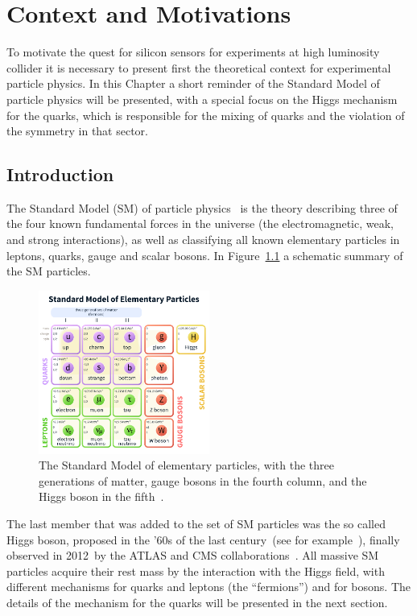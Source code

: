 \chapter{Context and Motivations}
\label{chap:context}
To motivate the quest for silicon sensors for experiments at high luminosity collider it is necessary 
to present first the theoretical context for experimental particle physics. In this Chapter a short 
reminder of the Standard Model of particle physics will be presented, with a special focus on 
the Higgs mechanism for the quarks, which is responsible for the mixing of quarks and the 
violation of the \CP symmetry in that sector.

\section{Introduction}
\label{sec:intro}

The Standard Model (SM) of particle physics~\cite{GLASHOW1961579,PhysRevLett.19.1264,SalamSM,PhysRevLett.30.1343,PhysRevLett.30.1346} is the theory describing three of the four known fundamental forces in the universe (the electromagnetic, weak, and strong interactions), as well as classifying all known elementary particles in leptons, quarks, gauge and scalar bosons. In Figure~\ref{fig:SM} a schematic summary of the SM 
particles.


\begin{figure}[htbp]
   \centering
   \includegraphics[width=0.5\textwidth]{SM.png} %
   \caption{The Standard Model of elementary particles, with the three generations of matter, gauge bosons in the fourth column, and the Higgs boson in the fifth~\cite{wiki:xxx}.}
   \label{fig:SM}
\end{figure}

The last member that was added to the set of SM particles was the so called Higgs boson, proposed in the '60s of the last century~(see for example~\cite{HIGGS1964132,PhysRevLett.13.321}),  finally observed in 2012~by the ATLAS and CMS collaborations~\cite{20121,201230}.
All massive SM particles acquire their rest mass by the interaction with the Higgs field, with different 
mechanisms for quarks and leptons (the ``fermions'') and for bosons. The details of the mechanism for 
the quarks will be presented in the next section.

